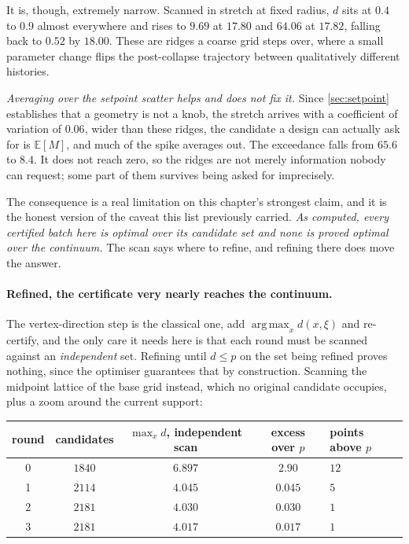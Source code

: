 \documentclass[10pt]{article}
\DeclareMathOperator*{\argmax}{arg\,max}
\begin{document}
It is, though, extremely narrow. Scanned in stretch at fixed radius, $d$ sits at $0.4$ to $0.9$
almost everywhere and rises to $9.69$ at $17.80$ and $64.06$ at $17.82$, falling back to $0.52$
by $18.00$. These are ridges a coarse grid steps over, where a small parameter change flips the
post-collapse trajectory between qualitatively different histories.

\emph{Averaging over the setpoint scatter helps and does not fix it.} Since \cref{sec:setpoint}
establishes that a geometry is not a knob, the stretch arrives with a coefficient of variation
of $0.06$, wider than these ridges, the candidate a design can actually ask for is
$\mathbb{E}[M]$, and much of the spike averages out. The exceedance falls from $65.6$ to $8.4$.
It does not reach zero, so the ridges are not merely information nobody can request; some part of
them survives being asked for imprecisely.

The consequence is a real limitation on this chapter's strongest claim, and it is the honest
version of the caveat this list previously carried. \emph{As computed, every certified batch here
is optimal over its candidate set and none is proved optimal over the continuum.} The scan says
where to refine, and refining there does move the answer.

\paragraph{Refined, the certificate very nearly reaches the continuum.} The vertex-direction step
is the classical one, add $\argmax_x d(x,\xi)$ and re-certify, and the only care it needs
here is that each round must be scanned against an \emph{independent} set. Refining until $d\le
p$ on the set being refined proves nothing, since the optimiser guarantees that by construction.
Scanning the midpoint lattice of the base grid instead, which no original candidate occupies,
plus a zoom around the current support:

\begin{center}
\begin{tabular}{ccccl}
\toprule
round & candidates & $\max_x d$, independent scan & excess over $p$ & points above $p$ \\
\midrule
0 & $1840$ & $6.897$ & $2.90$ & $12$ \\
1 & $2114$ & $4.045$ & $0.045$ & $5$ \\
2 & $2181$ & $4.030$ & $0.030$ & $1$ \\
3 & $2181$ & $\mathbf{4.017}$ & $\mathbf{0.017}$ & $1$ \\
\bottomrule
\end{tabular}
\end{center}
\end{document}
